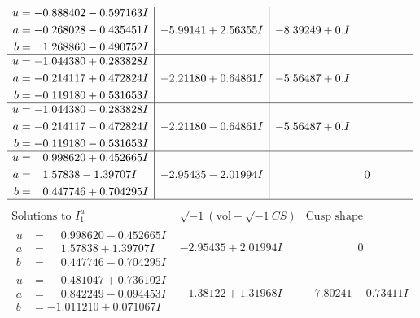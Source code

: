 \documentclass[1p]{elsarticle_modified}
\theoremstyle{definition}
\newcommand{\I}{\sqrt{-1}}
\begin{document}
$$\begin{array}{c|c|c}
\begin{aligned}
u &= -0.888402 - 0.597163 I \\
a &= -0.268028 - 0.435451 I \\
b &= \phantom{-}1.268860 - 0.490752 I\end{aligned}
 & -5.99141 + 2.56355 I & -8.39249 + 0. I\phantom{ +0.000000I} \\ \hline\begin{aligned}
u &= -1.044380 + 0.283828 I \\
a &= -0.214117 + 0.472824 I \\
b &= -0.119180 + 0.531653 I\end{aligned}
 & -2.21180 + 0.64861 I & -5.56487 + 0. I\phantom{ +0.000000I} \\ \hline\begin{aligned}
u &= -1.044380 - 0.283828 I \\
a &= -0.214117 - 0.472824 I \\
b &= -0.119180 - 0.531653 I\end{aligned}
 & -2.21180 - 0.64861 I & -5.56487 + 0. I\phantom{ +0.000000I} \\ \hline\begin{aligned}
u &= \phantom{-}0.998620 + 0.452665 I \\
a &= \phantom{-}1.57838 - 1.39707 I \\
b &= \phantom{-}0.447746 + 0.704295 I\end{aligned}
 & -2.95435 - 2.01994 I & \phantom{-0.000000 } 0\\
 \hline 
 \end{array}$$\newpage$$\begin{array}{c|c|c}  
\text{Solutions to }I^u_{1}& \I (\text{vol} + \sqrt{-1}CS) & \text{Cusp shape}\\
 \hline 
\begin{aligned}
u &= \phantom{-}0.998620 - 0.452665 I \\
a &= \phantom{-}1.57838 + 1.39707 I \\
b &= \phantom{-}0.447746 - 0.704295 I\end{aligned}
 & -2.95435 + 2.01994 I & \phantom{-0.000000 } 0 \\ \hline\begin{aligned}
u &= \phantom{-}0.481047 + 0.736102 I \\
a &= \phantom{-}0.842249 - 0.094453 I \\
b &= -1.011210 + 0.071067 I\end{aligned}
 & -1.38122 + 1.31968 I & -7.80241 - 0.73411 I \\ \hline\begin{aligned}

\end{aligned}
\end{array}$$
\end{document}
